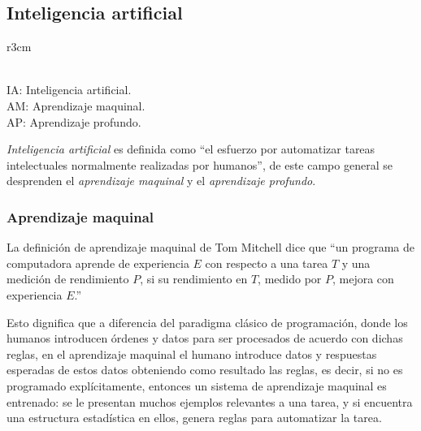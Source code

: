 \subsection {Inteligencia artificial}\label{subsec:intela}
\begin{wrapfigure}{r}{3cm}
	\centering\\
{\scriptsize IA: Inteligencia artificial.\\
AM: Aprendizaje maquinal.\\
AP: Aprendizaje profundo.\\}
\end{wrapfigure}\cite{cho18}\label{fig:AI}
\emph{Inteligencia artificial} es definida como ``el esfuerzo por automatizar tareas intelectuales normalmente realizadas por humanos''\cite{cho18}, de este campo general se desprenden el \emph{aprendizaje maquinal} y el \emph{aprendizaje profundo}.



\subsubsection {Aprendizaje maquinal}\label{subsec:machinel}
La definición de aprendizaje maquinal de Tom Mitchell\cite{mich19} dice que ``un programa de computadora aprende de experiencia $E$ con respecto a una tarea $T$ y una medición de rendimiento $P$, si su rendimiento en $T$, medido por $P$, mejora con experiencia $E$.''

Esto dignifica que a diferencia del paradigma clásico de programación, donde los humanos introducen órdenes y datos para ser procesados de acuerdo con dichas reglas, en el aprendizaje maquinal el humano introduce datos y respuestas esperadas de estos datos obteniendo como resultado las reglas, es decir, si no es programado explícitamente, entonces un sistema de aprendizaje maquinal es entrenado: se le presentan muchos ejemplos relevantes a una tarea, y si encuentra una estructura estadística en ellos, genera reglas para automatizar la tarea.
